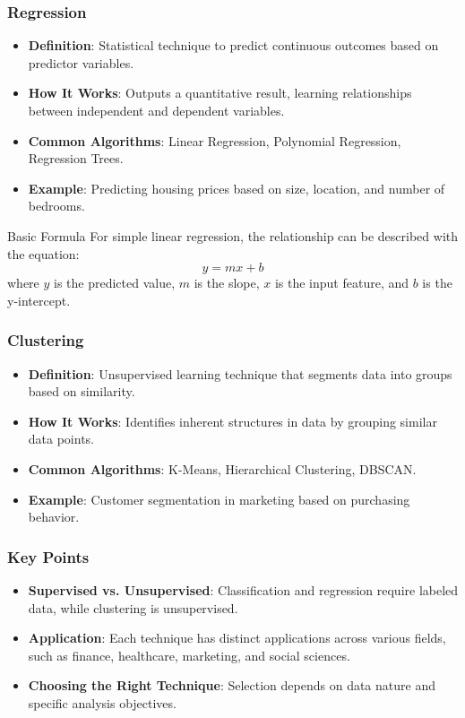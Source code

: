 \documentclass{beamer}
\begin{document}
\begin{frame}[fragile]
    \frametitle{Regression}
    \begin{itemize}
        \item \textbf{Definition}: Statistical technique to predict continuous outcomes based on predictor variables.
        \item \textbf{How It Works}: Outputs a quantitative result, learning relationships between independent and dependent variables.
        \item \textbf{Common Algorithms}: Linear Regression, Polynomial Regression, Regression Trees.
        \item \textbf{Example}: Predicting housing prices based on size, location, and number of bedrooms.
    \end{itemize}
    \begin{block}{Basic Formula}
        For simple linear regression, the relationship can be described with the equation:
        \[
        y = mx + b
        \]
        where \( y \) is the predicted value, \( m \) is the slope, \( x \) is the input feature, and \( b \) is the y-intercept.
    \end{block}
\end{frame}

\begin{frame}[fragile]
    \frametitle{Clustering}
    \begin{itemize}
        \item \textbf{Definition}: Unsupervised learning technique that segments data into groups based on similarity.
        \item \textbf{How It Works}: Identifies inherent structures in data by grouping similar data points.
        \item \textbf{Common Algorithms}: K-Means, Hierarchical Clustering, DBSCAN.
        \item \textbf{Example}: Customer segmentation in marketing based on purchasing behavior.
    \end{itemize}
\end{frame}

\begin{frame}[fragile]
    \frametitle{Key Points}
    \begin{itemize}
        \item \textbf{Supervised vs. Unsupervised}: Classification and regression require labeled data, while clustering is unsupervised.
        \item \textbf{Application}: Each technique has distinct applications across various fields, such as finance, healthcare, marketing, and social sciences.
        \item \textbf{Choosing the Right Technique}: Selection depends on data nature and specific analysis objectives.
    \end{itemize}
\end{frame}
\end{document}
